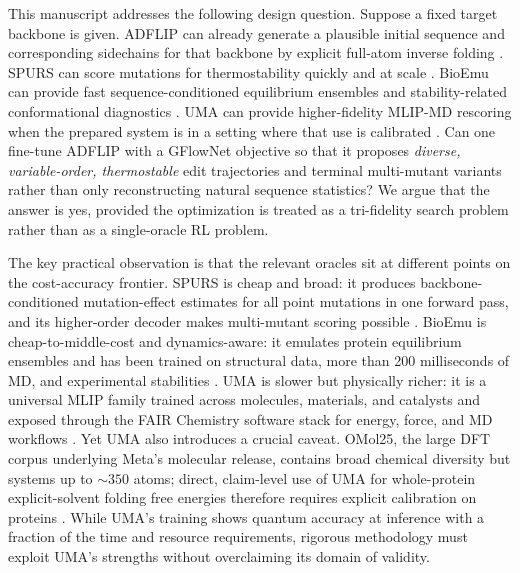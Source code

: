 \documentclass[11pt]{article}
\begin{document}
This manuscript addresses the following design question. Suppose a fixed target backbone is given. ADFLIP can already generate a plausible initial sequence and corresponding sidechains for that backbone by explicit full-atom inverse folding \citep{yi2025adflip}. SPURS can score mutations for thermostability quickly and at scale \citep{li2026spurs}. BioEmu can provide fast sequence-conditioned equilibrium ensembles and stability-related conformational diagnostics \citep{lewis2024bioemu}. UMA can provide higher-fidelity MLIP-MD rescoring when the prepared system is in a setting where that use is calibrated \citep{wood2025uma,levine2025omol25,fairchem2025github}. Can one fine-tune ADFLIP with a GFlowNet objective so that it proposes \emph{diverse, variable-order, thermostable} edit trajectories and terminal multi-mutant variants rather than only reconstructing natural sequence statistics? We argue that the answer is yes, provided the optimization is treated as a tri-fidelity search problem rather than as a single-oracle RL problem.

The key practical observation is that the relevant oracles sit at different points on the cost-accuracy frontier. SPURS is cheap and broad: it produces backbone-conditioned mutation-effect estimates for all point mutations in one forward pass, and its higher-order decoder makes multi-mutant scoring possible \citep{li2026spurs}. BioEmu is cheap-to-middle-cost and dynamics-aware: it emulates protein equilibrium ensembles and has been trained on structural data, more than 200 milliseconds of MD, and experimental stabilities \citep{lewis2024bioemu}. UMA is slower but physically richer: it is a universal MLIP family trained across molecules, materials, and catalysts and exposed through the FAIR Chemistry software stack for energy, force, and MD workflows \citep{wood2025uma,fairchem2025github}. Yet UMA also introduces a crucial caveat. OMol25, the large DFT corpus underlying Meta's molecular release, contains broad chemical diversity but systems up to $\sim 350$ atoms; direct, claim-level use of UMA for whole-protein explicit-solvent folding free energies therefore requires explicit calibration on proteins \citep{levine2025omol25}. While UMA's training shows quantum accuracy at inference with a fraction of the time and resource requirements, rigorous methodology must exploit UMA's strengths without overclaiming its domain of validity.
\end{document}
